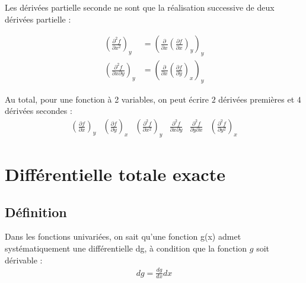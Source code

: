 Les dérivées partielle seconde ne sont que la réalisation successive de deux dérivées partielle : 

\begin{align*}
\left( \frac{\partial^2 f}{\partial x^2} \right)_y &= \left( \frac{\partial}{\partial x} \left( \frac{\partial f}{\partial x} \right)_y \right)_y \\
\left( \frac{\partial^2 f}{\partial x \partial y} \right)_y &= \left( \frac{\partial}{\partial x} \left( \frac{\partial f}{\partial y} \right)_x \right)_y
\end{align*}

Au total, pour une fonction à 2 variables, on peut écrire $2$ dérivées premières et $4$ dérivées secondes : 
\begin{align*}
\left( \frac{\partial f}{\partial x} \right)_y & \left( \frac{\partial f}{\partial y} \right)_x & \left( \frac{\partial^2 f}{\partial x^2} \right)_y & \frac{\partial^2 f}{\partial x \partial y} & \frac{\partial^2 f}{\partial y \partial x} & \left( \frac{\partial^2 f}{\partial y^2} \right)_x
\end{align*}




\section{Différentielle totale exacte}
\subsection{Définition}

Dans les fonctions univariées, on sait qu'une fonction g(x) admet systématiquement une différentielle dg, à condition que la fonction $g$ soit dérivable : 
\begin{align*}
dg = \frac{dg}{dx} dx
\end{align*}

